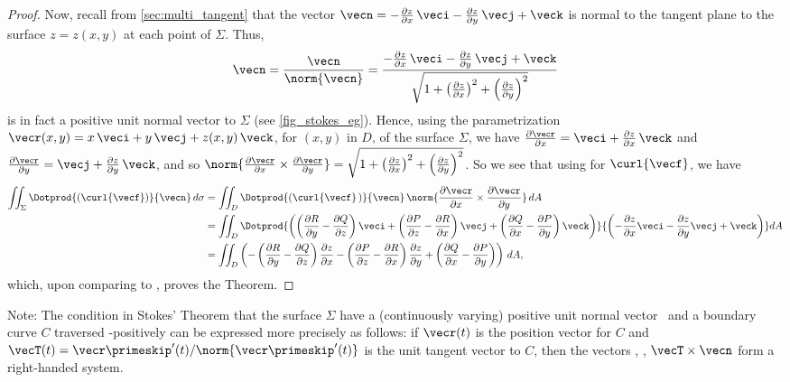 \begin{proof}
 Now, recall from \autoref{sec:multi_tangent} that the vector $\vecn = -\frac{\partial z}{\partial x}\,\veci - \frac{\partial z}{\partial y}\,\vecj + \veck$ is normal to the tangent plane to the surface $z=z(x,y)$ at each point of $\Sigma$. Thus,
 \[
  \vecn = \frac{\vecn}{\norm{\vecn}} =
   \frac{-\frac{\partial z}{\partial x}\,\veci - \frac{\partial z}{\partial y}\,\vecj +
   \veck}{\sqrt{1 + \left( \tfrac{\partial z}{\partial x} \right)^2 +
   \left( \tfrac{\partial z}{\partial y} \right)^2}}
 \]
 is in fact a positive unit normal vector to $\Sigma$ (see \autoref{fig_stokes_eg}). Hence, using the parametrization $\vecr(x,y) = x\,\veci + y\,\vecj + z(x,y)\,\veck$, for $(x,y)$ in $D$, of the surface $\Sigma$, we have $\frac{\partial \vecr}{\partial x} = \veci + \frac{\partial z}{\partial x}\,\veck$ and $\frac{\partial \vecr}{\partial y} = \vecj + \frac{\partial z}{\partial y}\,\veck$, and so $\norm{\frac{\partial \vecr}{\partial x}\times\frac{\partial \vecr}{\partial y}} = \sqrt{1 + \left( \tfrac{\partial z}{\partial x} \right)^2 + \left( \tfrac{\partial z}{\partial y} \right)^2}$. So we see that using  for $\curl{\vecf}$, we have
 \begin{align*}
  \iint_{\Sigma} \Dotprod{(\curl{\vecf})}{\vecn}\,d\sigma &=
   \iint_{D} \Dotprod{(\curl{\vecf}\,)}{\vecn}\,
   \norm{\frac{\partial \vecr}{\partial x}\times\frac{\partial \vecr}{\partial y}}\,dA\\
   &= \iint_{D} \Dotprod{\left( \left( \frac{\partial R}{\partial y} - \frac{\partial Q}{\partial z} \right)
    \veci + \left( \frac{\partial P}{\partial z} - \frac{\partial R}{\partial x} \right) \vecj +
    \left( \frac{\partial Q}{\partial x} - \frac{\partial P}{\partial y} \right) \veck
    \right)}{\left( -\frac{\partial z}{\partial x}\veci - \frac{\partial z}{\partial y}\vecj +
    \veck \right)} dA\\
   &= \iint_{D} \left(
    -\left( \frac{\partial R}{\partial y} - \frac{\partial Q}{\partial z} \right) \frac{\partial z}{\partial x}
    -\left( \frac{\partial P}{\partial z} - \frac{\partial R}{\partial x} \right) \frac{\partial z}{\partial y}
    + \left( \frac{\partial Q}{\partial x} - \frac{\partial P}{\partial y} \right) \right)\,dA ,
 \end{align*}
 which, upon comparing to , proves the Theorem.
\end{proof}

Note: The condition in Stokes' Theorem that the surface $\Sigma$ have a (continuously varying) positive unit normal vector \vecn\ and a boundary curve $C$ traversed \vecn-positively can be expressed more precisely as follows: if $\vecr(t)$ is the position vector for $C$ and $\vecT(t) = \vecr\primeskip'(t)/\norm{\vecr\primeskip'(t)}$ is the unit tangent vector to $C$, then the vectors \vecT, \vecn, $\vecT\times\vecn$ form a right-handed system.

